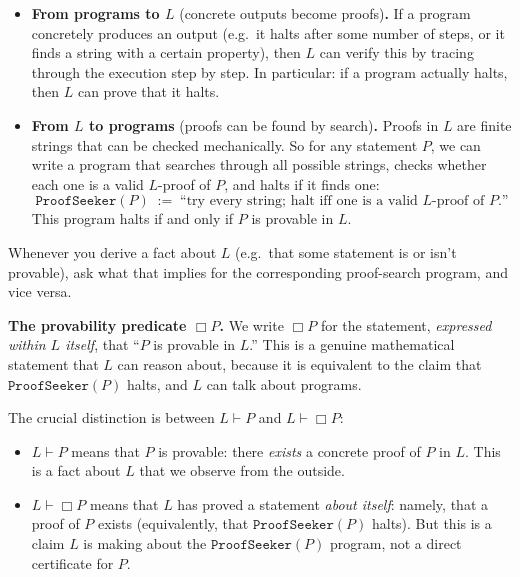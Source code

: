 \documentclass[8pt]{article}
\begin{document}
\begin{itemize}
  \item \textbf{From programs to $L$} (concrete outputs become proofs)\textbf{.} If a
    program concretely produces an output (e.g.\ it halts after some number of steps,
    or it finds a string with a certain property), then $L$ can verify this by tracing
    through the execution step by step. In particular: if a program actually halts,
    then $L$ can prove that it halts.

  \item \textbf{From $L$ to programs} (proofs can be found by search)\textbf{.} Proofs
    in $L$ are finite strings that can be checked mechanically. So for any statement
    $P$, we can write a program that searches through all possible strings, checks
    whether each one is a valid $L$-proof of $P$, and halts if it finds one:
    \[
      \texttt{ProofSeeker}(P) \;:=\;
      \text{``try every string; halt iff one is a valid $L$-proof of $P$.''}
    \]
    This program halts if and only if $P$ is provable in $L$.
\end{itemize}

\medskip
\noindent
Whenever you derive a fact about $L$ (e.g.\ that some statement is or isn't provable),
ask what that implies for the corresponding proof-search program, and vice versa.

\medskip
\noindent
\textbf{The provability predicate $\Box P$.} We write $\Box P$ for the statement,
\emph{expressed within $L$ itself}, that ``$P$ is provable in $L$.'' This is a genuine
mathematical statement that $L$ can reason about, because it is equivalent to the claim
that $\texttt{ProofSeeker}(P)$ halts, and $L$ can talk about programs.

\medskip
\noindent
The crucial distinction is between $L \vdash P$ and $L \vdash \Box P$:

\begin{itemize}
  \item $L \vdash P$ means that $P$ is provable: there \emph{exists} a concrete proof
    of $P$ in $L$. This is a fact about $L$ that we observe from the outside.

  \item $L \vdash \Box P$ means that $L$ has proved a statement \emph{about itself}:
    namely, that a proof of $P$ exists (equivalently, that
    $\texttt{ProofSeeker}(P)$ halts). But this is a claim $L$ is making about
    the  $\texttt{ProofSeeker}(P)$ program, not a direct certificate for $P$.
\end{itemize}
\end{document}
